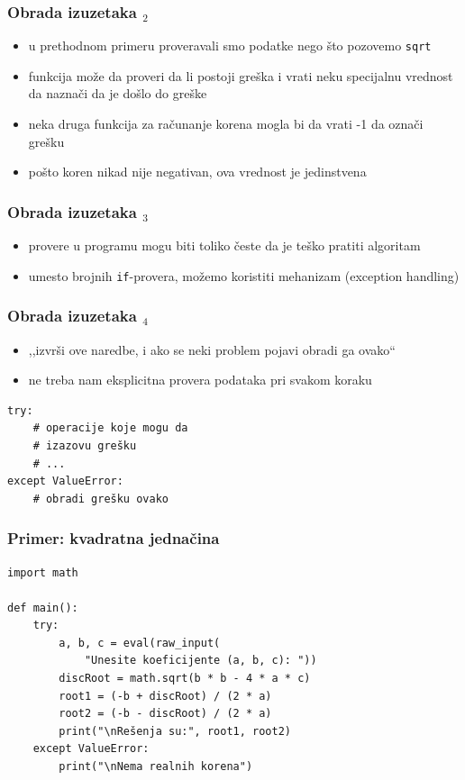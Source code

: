\documentclass[utf8,compress]{beamer}
\begin{document}
\begin{frame}[fragile]
  \frametitle{Obrada izuzetaka $_2$}
  \begin{itemize}
    \item u prethodnom primeru proveravali smo podatke  nego što pozovemo \texttt{sqrt}
    \item funkcija može da proveri da li postoji greška i vrati neku specijalnu vrednost da naznači da je došlo do greške
    \item neka druga funkcija za računanje korena mogla bi da vrati -1 da označi grešku
    \item pošto koren nikad nije negativan, ova vrednost je jedinstvena
  \end{itemize}
\end{frame}

\begin{frame}[fragile]
  \frametitle{Obrada izuzetaka $_3$}
  \begin{itemize}
    \item provere u programu mogu biti toliko česte da je teško pratiti algoritam
    \item umesto brojnih \texttt{if}-provera, možemo koristiti mehanizam  (exception handling)
  \end{itemize}
\end{frame}

\begin{frame}[fragile]
  \frametitle{Obrada izuzetaka $_4$}
  \begin{itemize}
    \item ,,izvrši ove naredbe, i ako se neki problem pojavi obradi ga ovako``
    \item ne treba nam eksplicitna provera podataka pri svakom koraku
  \end{itemize}
\begin{verbatim}
try:
    # operacije koje mogu da
    # izazovu grešku
    # ...
except ValueError:
    # obradi grešku ovako
\end{verbatim}
\end{frame}

\begin{frame}[fragile]
  \frametitle{Primer: kvadratna jednačina}
\begin{verbatim}
import math

def main():
    try:
        a, b, c = eval(raw_input(
            "Unesite koeficijente (a, b, c): "))
        discRoot = math.sqrt(b * b - 4 * a * c)
        root1 = (-b + discRoot) / (2 * a)
        root2 = (-b - discRoot) / (2 * a)
        print("\nRešenja su:", root1, root2)
    except ValueError:
        print("\nNema realnih korena")
\end{verbatim}
\end{frame}
\end{document}
